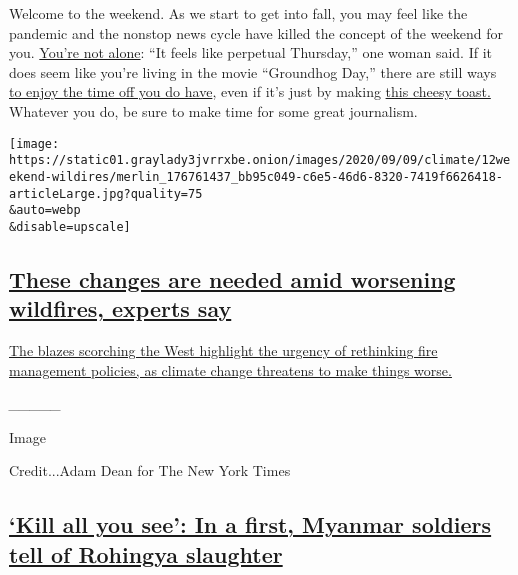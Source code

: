Welcome to the weekend. As we start to get into fall, you may feel like
the pandemic and the nonstop news cycle have killed the concept of the
weekend for you.
\href{https://www.nytimes3xbfgragh.onion/2020/09/09/style/what-should-i-do-this-weekend.html}{You're
not alone}: ``It feels like perpetual Thursday,'' one woman said. If it
does seem like you're living in the movie ``Groundhog Day,'' there are
still ways
\href{https://www.nytimes3xbfgragh.onion/2020/09/10/arts/things-to-do-weekend-coronavirus.html}{to
enjoy the time off you do have}, even if it's just by making
\href{https://www.nytimes3xbfgragh.onion/2020/09/09/dining/spinach-rarebit-recipe.html}{this
cheesy toast.} Whatever you do, be sure to make time for some great
journalism.

\texttt{[image: https://static01.graylady3jvrrxbe.onion/images/2020/09/09/climate/12weekend-wildires/merlin\_176761437\_bb95c049-c6e5-46d6-8320-7419f6626418-articleLarge.jpg?quality=75\\\&auto=webp\\\&disable=upscale]}

\hypertarget{these-changes-are-needed-amid-worsening-wildfires-experts-say}{%
\subsection{\texorpdfstring{\href{https://www.nytimes3xbfgragh.onion/2020/09/10/climate/wildfires-climate-policy.html}{These
changes are needed amid worsening wildfires, experts
say}}{These changes are needed amid worsening wildfires, experts say}}\label{these-changes-are-needed-amid-worsening-wildfires-experts-say}}

\href{https://www.nytimes3xbfgragh.onion/2020/09/10/climate/wildfires-climate-policy.html}{The
blazes scorching the West highlight the urgency of rethinking fire
management policies, as climate change threatens to make things worse.}

\emph{\_\_\_\_\_}

Image

Credit...Adam Dean for The New York Times

\hypertarget{kill-all-you-see-in-a-first-myanmar-soldiers-tell-of-rohingya-slaughter}{%
\subsection{\texorpdfstring{\href{https://www.nytimes3xbfgragh.onion/2020/09/08/world/asia/myanmar-rohingya-genocide.html}{`Kill
all you see': In a first, Myanmar soldiers tell of Rohingya
slaughter}}{`Kill all you see': In a first, Myanmar soldiers tell of Rohingya slaughter}}\label{kill-all-you-see-in-a-first-myanmar-soldiers-tell-of-rohingya-slaughter}}

